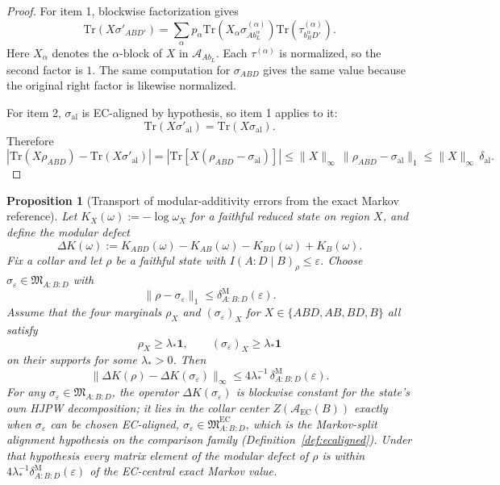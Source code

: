 \documentclass[11pt]{article}
\newtheorem{proposition}[theorem]{Proposition}
\begin{document}
\begin{proof}
For item 1, blockwise factorization gives
\[
\mathrm{Tr}(X\sigma'_{AB D'})
=
\sum_\alpha p_\alpha
\mathrm{Tr}\!\left(X_\alpha\sigma^{(\alpha)}_{A b_L^\alpha}\right)
\mathrm{Tr}\!\left(\tau^{(\alpha)}_{b_R^\alpha D'}\right).
\]
Here \(X_\alpha\) denotes the \(\alpha\)-block of \(X\) in \(\mathcal A_{A b_L}\). Each \(\tau^{(\alpha)}\) is normalized, so the second factor is \(1\). The same computation for \(\sigma_{ABD}\) gives the same value because the original right factor is likewise normalized.

For item 2, \(\sigma_{\mathrm{al}}\) is EC-aligned by hypothesis, so item 1 applies to it:
\[
\mathrm{Tr}(X\sigma'_{\mathrm{al}})=\mathrm{Tr}(X\sigma_{\mathrm{al}}).
\]
Therefore
\[
\left|
\mathrm{Tr}(X\rho_{ABD})-\mathrm{Tr}(X\sigma'_{\mathrm{al}})
\right|
=
\left|
\mathrm{Tr}\!\left[X(\rho_{ABD}-\sigma_{\mathrm{al}})\right]
\right|
\le
\|X\|_\infty\,\|\rho_{ABD}-\sigma_{\mathrm{al}}\|_1
\le
\|X\|_\infty\,\delta_{\mathrm{al}}.
\]
\end{proof}

\begin{proposition}[Transport of modular-additivity errors from the exact Markov reference]\label{prop:modulartransport}
Let \(K_X(\omega):=-\log \omega_X\) for a faithful reduced state on region \(X\), and define the modular defect
\[
\Delta K(\omega):=
K_{ABD}(\omega)-K_{AB}(\omega)-K_{BD}(\omega)+K_B(\omega).
\]
Fix a collar and let \(\rho\) be a faithful state with \(I(A:D\mid B)_\rho\le \varepsilon\). Choose \(\sigma_\varepsilon\in \mathfrak M_{A:B:D}\) with
\[
\|\rho-\sigma_\varepsilon\|_1\le \delta^{\mathrm M}_{A:B:D}(\varepsilon).
\]
Assume that the four marginals \(\rho_X\) and \((\sigma_\varepsilon)_X\) for \(X\in\{ABD,AB,BD,B\}\) all satisfy
\[
\rho_X\ge \lambda_\ast \mathbf 1,
\qquad
(\sigma_\varepsilon)_X\ge \lambda_\ast \mathbf 1
\]
on their supports for some \(\lambda_\ast>0\). Then
\[
\|\Delta K(\rho)-\Delta K(\sigma_\varepsilon)\|_\infty
\le
4\lambda_\ast^{-1}\,\delta^{\mathrm M}_{A:B:D}(\varepsilon).
\]
For any \(\sigma_\varepsilon\in\mathfrak M_{A:B:D}\), the operator \(\Delta K(\sigma_\varepsilon)\) is blockwise constant for the state's \emph{own} HJPW decomposition; it lies in the collar center \(Z(\mathcal A_{\mathrm{EC}}(B))\) exactly when \(\sigma_\varepsilon\) can be chosen EC-aligned, \(\sigma_\varepsilon\in\mathfrak M^{\mathrm{EC}}_{A:B:D}\), which is the Markov-split alignment hypothesis on the comparison family (Definition~\ref{def:ecaligned}). Under that hypothesis every matrix element of the modular defect of \(\rho\) is within \(4\lambda_\ast^{-1}\delta^{\mathrm M}_{A:B:D}(\varepsilon)\) of the EC-central exact Markov value.
\end{proposition}
\end{document}
